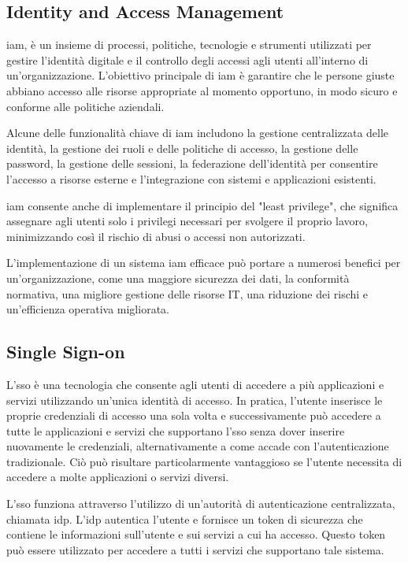 \subsection{Identity and Access Management}

\acrshort{iam}\cite{site:iam}, è un insieme di processi, politiche, tecnologie e strumenti utilizzati per gestire l'identità digitale e il controllo degli accessi agli utenti all'interno di un'organizzazione. L'obiettivo principale di \acrshort{iam} è garantire che le persone giuste abbiano accesso alle risorse appropriate al momento opportuno, in modo sicuro e conforme alle politiche aziendali.

Alcune delle funzionalità chiave di \acrshort{iam} includono la gestione centralizzata delle identità, la gestione dei ruoli e delle politiche di accesso, la gestione delle password, la gestione delle sessioni, la federazione dell'identità per consentire l'accesso a risorse esterne e l'integrazione con sistemi e applicazioni esistenti.

\acrshort{iam} consente anche di implementare il principio del "least privilege", che significa assegnare agli utenti solo i privilegi necessari per svolgere il proprio lavoro, minimizzando così il rischio di abusi o accessi non autorizzati.

L'implementazione di un sistema \acrshort{iam} efficace può portare a numerosi benefici per un'organizzazione, come una maggiore sicurezza dei dati, la conformità normativa, una migliore gestione delle risorse IT, una riduzione dei rischi e un'efficienza operativa migliorata.


\subsection{Single Sign-on}

L'\acrshort{sso}\cite{site:sso} è una tecnologia che consente agli utenti di accedere a più applicazioni e servizi utilizzando un'unica identità di accesso. In pratica, l'utente inserisce le proprie credenziali di accesso una sola volta e successivamente può accedere a tutte le applicazioni e servizi che supportano l'\acrshort{sso} senza dover inserire nuovamente le credenziali, alternativamente a come accade con l'autenticazione tradizionale. Ciò può risultare particolarmente vantaggioso se l'utente necessita di accedere a molte applicazioni o servizi diversi.

L'\acrshort{sso} funziona attraverso l'utilizzo di un'autorità di autenticazione centralizzata, chiamata \acrfull{idp}. L'\acrshort{idp} autentica l'utente e fornisce un token di sicurezza che contiene le informazioni sull'utente e sui servizi a cui ha accesso. Questo token può essere utilizzato per accedere a tutti i servizi che supportano tale sistema.

